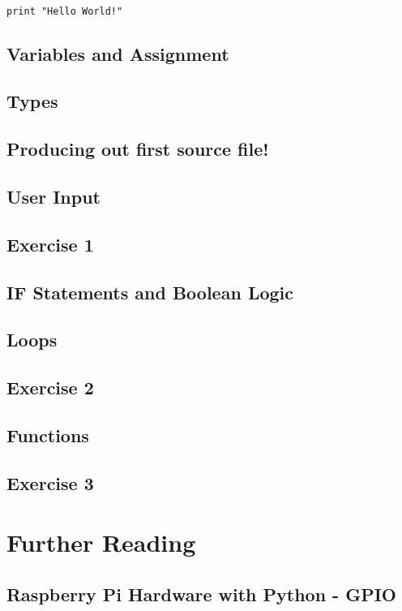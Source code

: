 \documentclass[twocolumn]{article}
\begin{document}
\begin{lstlisting}

print "Hello World!"

\end{lstlisting}


\subsection{Variables and Assignment}

\subsection{Types}

\subsection{Producing out first source file!}

\subsection{User Input}

\subsection{Exercise 1}

\subsection{IF Statements and Boolean Logic}

\subsection{Loops}

\subsection{Exercise 2}

\subsection{Functions}

\subsection{Exercise 3}

\section{Further Reading}

\subsection{Raspberry Pi Hardware with Python - GPIO}
\end{document}
